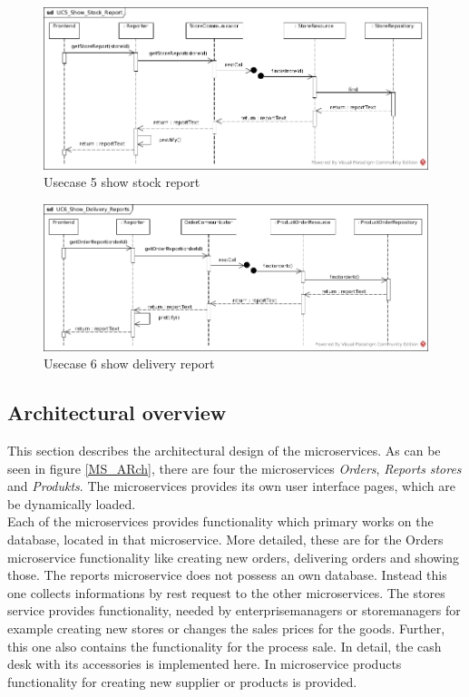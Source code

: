 			\begin{figure}[!h]
				\centering
				\includegraphics[width = 1\textwidth]{img/UC5_Show_Stock_Report.jpg}
				\caption{Usecase 5 show stock report}
				\label{MS_UC5}
			\end{figure}
			
			\begin{figure}[!h]
				\centering
				\includegraphics[width = 1\textwidth]{img/UC6_Show_Delivery_Reports.jpg}
				\caption{Usecase 6 show delivery report}
				\label{MS_UC6}
			\end{figure}
			
	\FloatBarrier
	\subsection{Architectural overview}	\label{archiOverviewMicro}	
	This section describes the architectural design of the microservices. As can be seen in figure \ref{MS_ARch}, there are four the microservices \textit{Orders}, \textit{Reports} \textit{stores} and \textit{Produkts}. The microservices provides its own user interface pages, which are be dynamically loaded. \\
	Each of the microservices provides functionality which primary works on the database, located in that microservice. More detailed, these are for the Orders microservice functionality like creating new orders, delivering orders and showing those. The reports microservice does not possess an own database. Instead this one collects informations by rest request to the other microservices. The stores service provides functionality, needed by enterprisemanagers or storemanagers for example creating new stores or changes the sales prices for the goods. Further, this one also contains the functionality for the process sale. In detail, the cash desk with its accessories is implemented here. In microservice products functionality for creating new supplier or products is provided.
	
